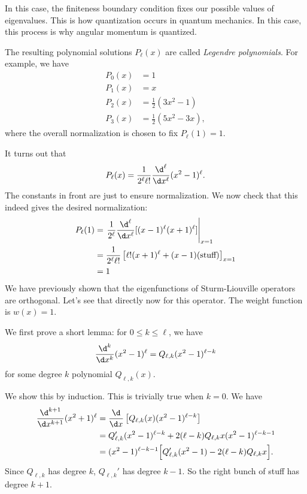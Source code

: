 \documentclass[a4paper]{article}
\begin{document}
In this case, the finiteness boundary condition fixes our possible values of eigenvalues. This is how quantization occurs in quantum mechanics. In this case, this process is why angular momentum is quantized.

The resulting polynomial solutions $P_\ell(x)$ are called \emph{Legendre polynomials}. For example, we have
\begin{align*}
  P_0(x) &= 1\\
  P_1(x) &= x\\
  P_2(x) &= \frac{1}{2}(3x^2 - 1)\\
  P_3(x) &= \frac{1}{2}(5x^2 - 3x),
\end{align*}
where the overall normalization is chosen to fix $P_\ell(1) = 1$.

It turns out that
\[
  P_\ell(x) = \frac{1}{2^\ell \ell!} \frac{\d^\ell}{\d x^\ell} (x^2 - 1)^\ell.
\]
The constants in front are just to ensure normalization. We now check that this indeed gives the desired normalization:
\begin{align*}
  P_\ell(1) &= \left.\frac{1}{2^\ell} \frac{\d^\ell}{\d x^\ell}[(x - 1)^\ell (x + 1)^\ell]\right|_{x = 1}\\
  &= \frac{1}{2^\ell \ell!} \left[\ell!(x + 1)^\ell + (x - 1)(\text{stuff})\right]_{x = 1}\\
  &= 1
\end{align*}
We have previously shown that the eigenfunctions of Sturm-Liouville operators are orthogonal. Let's see that directly now for this operator. The weight function is $w(x) = 1$.

We first prove a short lemma: for $0 \leq k \leq \ell$, we have
\[
  \frac{\d^k}{\d x^k}(x^2 - 1)^\ell = Q_{\ell, k}(x^2 - 1)^{\ell - k}
\]
for some degree $k$ polynomial $Q_{\ell, k}(x)$.

We show this by induction. This is trivially true when $k = 0$. We have
\begin{align*}
  \frac{\d^{k + 1}}{\d x^{k + 1}} (x^2 + 1)^\ell &= \frac{\d}{\d x}\left[Q_{\ell, k}(x) (x^2 - 1)^{\ell - k}\right] \\
  &= Q_{\ell, k}' (x^2 - 1)^{\ell - k} + 2(\ell - k)Q_{\ell, k} x(x^2 - 1)^{\ell - k - 1}\\
  &= (x^2 - 1)^{\ell - k - 1}\Big[Q_{\ell, k}'(x^2 - 1) - 2(\ell - k)Q_{\ell, k} x\Big].
\end{align*}
Since $Q_{\ell, k}$ has degree $k$, $Q_{\ell, k}'$ has degree $k - 1$. So the right bunch of stuff has degree $k + 1$.
\end{document}
